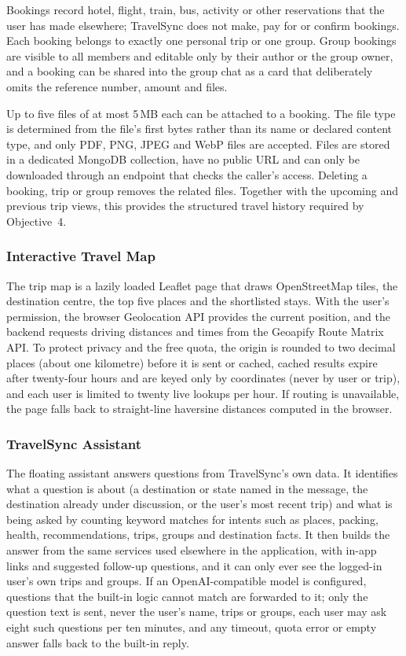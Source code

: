 Bookings record hotel, flight, train, bus, activity or other reservations
that the user has made elsewhere; TravelSync does not make, pay for or
confirm bookings. Each booking belongs to exactly one personal trip or one
group. Group bookings are visible to all members and editable only by their
author or the group owner, and a booking can be shared into the group chat
as a card that deliberately omits the reference number, amount and files.

Up to five files of at most 5\,MB each can be attached to a booking. The file
type is determined from the file's first bytes rather than its name or
declared content type, and only PDF, PNG, JPEG and WebP files are accepted.
Files are stored in a dedicated MongoDB collection, have no public URL and
can only be downloaded through an endpoint that checks the caller's access.
Deleting a booking, trip or group removes the related files. Together with
the upcoming and previous trip views, this provides the structured travel
history required by Objective~4.

\subsubsection{Interactive Travel Map}

The trip map is a lazily loaded Leaflet \cite{leaflet} page that draws
OpenStreetMap tiles, the destination centre, the top five places and the
shortlisted stays. With the user's permission, the browser Geolocation API
provides the current position, and the backend requests driving distances
and times from the Geoapify Route Matrix API. To protect privacy and the
free quota, the origin is rounded to two decimal places (about one
kilometre) before it is sent or cached, cached results expire after
twenty-four hours and are keyed only by coordinates (never by user or trip),
and each user is limited to twenty live lookups per hour. If routing is
unavailable, the page falls back to straight-line haversine distances
computed in the browser.

\subsubsection{TravelSync Assistant}

The floating assistant answers questions from TravelSync's own data. It
identifies what a question is about (a destination or state named in the
message, the destination already under discussion, or the user's most
recent trip) and what is being asked by counting keyword matches for
intents such as places, packing, health, recommendations, trips, groups and
destination facts. It then builds the answer from the same services used
elsewhere in the application, with in-app links and suggested follow-up
questions, and it can only ever see the logged-in user's own trips and
groups. If an OpenAI-compatible model is configured, questions that the
built-in logic cannot match are forwarded to it; only the question text is
sent, never the user's name, trips or groups, each user may ask eight such
questions per ten minutes, and any timeout, quota error or empty answer
falls back to the built-in reply.

